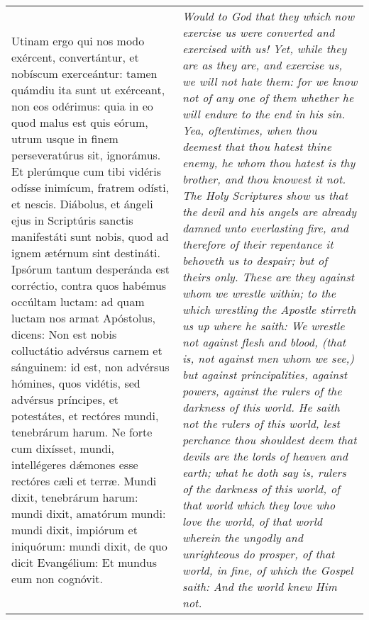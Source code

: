 \begin{tabular}{p{8cm} | p{8cm}}
Utinam ergo qui nos modo exércent, convertántur, et nobíscum exerceántur: tamen quámdiu ita sunt ut exérceant, non eos odérimus: quia in eo quod malus est quis eórum, utrum usque in finem perseveratúrus sit, ignorámus. Et plerúmque cum tibi vidéris odísse inimícum, fratrem odísti, et nescis. Diábolus, et ángeli ejus in Scriptúris sanctis manifestáti sunt nobis, quod ad ignem ætérnum sint destináti. Ipsórum tantum desperánda est corréctio, contra quos habémus occúltam luctam: ad quam luctam nos armat Apóstolus, dicens: Non est nobis colluctátio advérsus carnem et sánguinem: id est, non advérsus hómines, quos vidétis, sed advérsus príncipes, et potestátes, et rectóres mundi, tenebrárum harum. Ne forte cum dixísset, mundi, intellégeres d\'{\ae}mones esse rectóres cæli et terræ. Mundi dixit, tenebrárum harum: mundi dixit, amatórum mundi: mundi dixit, impiórum et iniquórum: mundi dixit, de quo dicit Evangélium: Et mundus eum non cognóvit.
& \textit{Would to God that they which now exercise us were converted and exercised with us! Yet, while they are as they are, and exercise us, we will not hate them: for we know not of any one of them whether he will endure to the end in his sin. Yea, oftentimes, when thou deemest that thou hatest thine enemy, he whom thou hatest is thy brother, and thou knowest it not. The Holy Scriptures show us that the devil and his angels are already damned unto everlasting fire, and therefore of their repentance it behoveth us to despair; but of theirs only. These are they against whom we wrestle within; to the which wrestling the Apostle stirreth us up where he saith: We wrestle not against flesh and blood, (that is, not against men whom we see,) but against principalities, against powers, against the rulers of the darkness of this world. He saith not the rulers of this world, lest perchance thou shouldest deem that devils are the lords of heaven and earth; what he doth say is, rulers of the darkness of this world, of that world which they love who love the world, of that world wherein the ungodly and unrighteous do prosper, of that world, in fine, of which the Gospel saith: And the world knew Him not.}
\end{tabular}